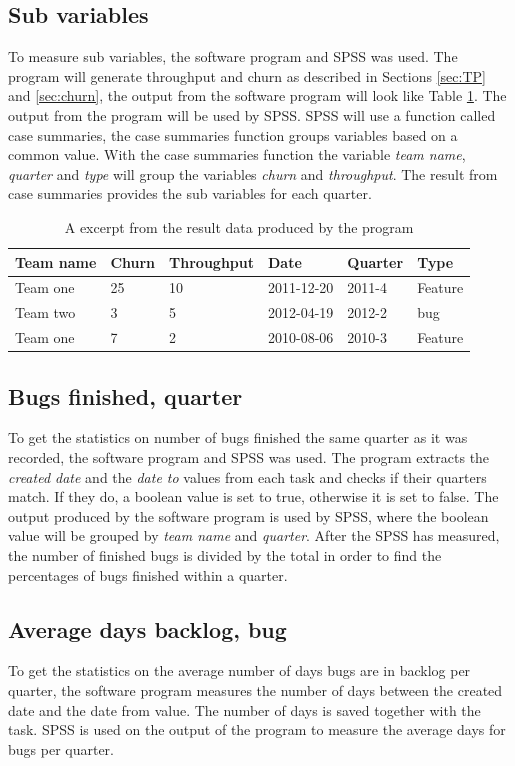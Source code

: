 \documentclass[UKenglish]{ifimaster}  %
\begin{document}
\subsection {Sub variables}
\label{sec:bug}
To measure sub variables, the software program and SPSS was used. The program will generate throughput and churn as described in Sections \ref{sec:TP} and \ref{sec:churn}, the output from the software program will look like Table \ref{tab:ftb}. The output from the program will be used by SPSS. SPSS will use a function called case summaries, the case summaries function groups variables based on a common value.  With the case summaries function the variable \textit{team name}, \textit{quarter} and \textit{type} will group the variables \textit{churn} and \textit{throughput}. The result from case summaries provides the sub variables for each quarter.
\begin{table}[!ht]
\center
\begin{tabular}{ | l | l | l | l | l |l | }
\hline
	\bf{Team name} & \bf{Churn} &\bf{Throughput} & \bf{Date} & \bf{Quarte}r & \bf{Type} \\ \hline
	Team one & 25 &10&2011-12-20& 2011-4 & Feature \\ \hline
	Team two & 3 &5&2012-04-19 & 2012-2 & bug \\ \hline
	Team one & 7 &2& 2010-08-06 & 2010-3 & Feature \\ \hline
\end{tabular}
\caption{A excerpt from the result data produced by the program }
\label{tab:ftb} 
\end{table}

\subsection{Bugs finished, quarter}
\label{sub:sec:bfq} 
To get the statistics on number of bugs finished the same quarter as it was recorded, the software program and SPSS was used. The program extracts the \textit{created date} and the \textit{date to} values from each task and checks if their quarters match. If they do, a boolean value is set to true, otherwise it is set to false. The output produced by the software program is used by SPSS, where the boolean value will be grouped by \textit{team name} and \textit{quarter}. After the SPSS has measured, the number of finished bugs is divided by the total in order to find the percentages of bugs finished within a quarter. 
\subsection{Average days backlog, bug}
\label{sub:sec:adbb}
To get the statistics on the average number of days bugs are in backlog per quarter, the software program measures the number of days between the created date and the date from value. The number of days is saved together with the task. SPSS is used on the output of the program to measure the average days for bugs per quarter.
\end{document}
